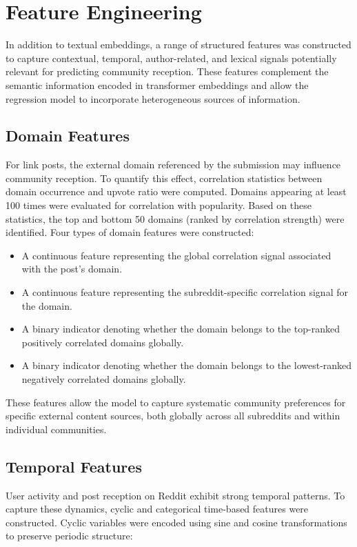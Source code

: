 \section{Feature Engineering}

In addition to textual embeddings, a range of structured features was constructed to capture contextual, temporal, author-related, and lexical signals potentially relevant for predicting community reception. These features complement the semantic information encoded in transformer embeddings and allow the regression model to incorporate heterogeneous sources of information.

\subsection{Domain Features}

For link posts, the external domain referenced by the submission may influence community reception. To quantify this effect, correlation statistics between domain occurrence and upvote ratio were computed.
Domains appearing at least 100 times were evaluated for correlation with popularity. Based on these statistics, the top and bottom 50 domains (ranked by correlation strength) were identified.
Four types of domain features were constructed:

\begin{itemize}
    \item A continuous feature representing the global correlation signal associated with the post's domain.
    \item A continuous feature representing the subreddit-specific correlation signal for the domain.
    \item A binary indicator denoting whether the domain belongs to the top-ranked positively correlated domains globally.
    \item A binary indicator denoting whether the domain belongs to the lowest-ranked negatively correlated domains globally.
\end{itemize}

These features allow the model to capture systematic community preferences for specific external content sources, both globally across all subreddits and within individual communities.

\subsection{Temporal Features}

User activity and post reception on Reddit exhibit strong temporal patterns. To capture these dynamics, cyclic and categorical time-based features were constructed.
Cyclic variables were encoded using sine and cosine transformations to preserve periodic structure:

